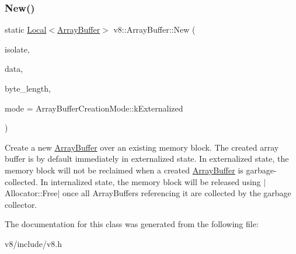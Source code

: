 \subsubsection{\texorpdfstring{New()}{New()}\hspace{0.1cm}{\footnotesize\ttfamily [2/2]}}
{\footnotesize\ttfamily static \mbox{\hyperlink{classv8_1_1Local}{Local}}$<$\mbox{\hyperlink{classv8_1_1ArrayBuffer}{Array\+Buffer}}$>$ v8\+::\+Array\+Buffer\+::\+New (\begin{DoxyParamCaption}\item[{Isolate $\ast$}]{isolate,  }\item[{void $\ast$}]{data,  }\item[{size\+\_\+t}]{byte\+\_\+length,  }\item[{Array\+Buffer\+Creation\+Mode}]{mode = {\ttfamily ArrayBufferCreationMode\+:\+:kExternalized} }\end{DoxyParamCaption})\hspace{0.3cm}{\ttfamily [static]}}

Create a new \mbox{\hyperlink{classv8_1_1ArrayBuffer}{Array\+Buffer}} over an existing memory block. The created array buffer is by default immediately in externalized state. In externalized state, the memory block will not be reclaimed when a created \mbox{\hyperlink{classv8_1_1ArrayBuffer}{Array\+Buffer}} is garbage-\/collected. In internalized state, the memory block will be released using $\vert$\+Allocator\+::\+Free$\vert$ once all Array\+Buffers referencing it are collected by the garbage collector. 

The documentation for this class was generated from the following file\+:\begin{DoxyCompactItemize}
\item 
v8/include/v8.\+h\end{DoxyCompactItemize}
